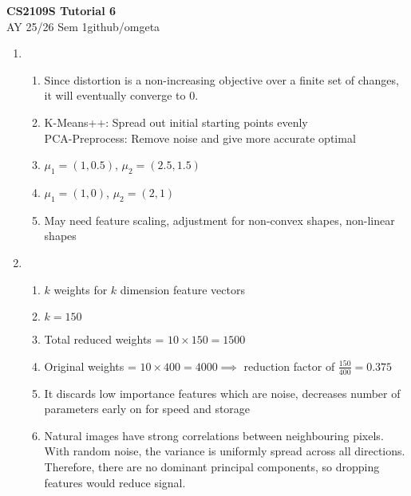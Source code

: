 \documentclass[12pt, a4paper]{article}
\newcommand{\mytitle}{CS2109S Tutorial 6}
\newcommand{\myauthor}{github/omgeta}
\newcommand{\mydate}{AY 25/26 Sem 1}
\begin{document}
\raggedright
\footnotesize
\begin{center}
{\normalsize{\textbf{\mytitle}}} \\
{\footnotesize{\mydate\hspace{2pt}\textemdash\hspace{2pt}\myauthor}}
\end{center}
\begin{enumerate}[\Alph*.]
  \item 
    \begin{enumerate}[\arabic*.]
      \item Since distortion is a non-increasing objective over a finite set of changes, it will eventually converge to 0. 

      \item K-Means++: Spread out initial starting points evenly\\
        PCA-Preprocess: Remove noise and give more accurate optimal

      \item $\mu_1 = (1, 0.5)$, $\mu_2 = (2.5, 1.5)$

      \item $\mu_1 = (1, 0)$, $\mu_2 = (2, 1)$

      \item May need feature scaling, adjustment for non-convex shapes, non-linear shapes
    \end{enumerate}

  \item 
    \begin{enumerate}[\arabic*.]
      \item $k$ weights for $k$ dimension feature vectors

      \item $k = 150$

      \item Total reduced weights = $10 \times 150 = 1500$ 

      \item Original weights = $10 \times 400 = 4000 \implies$ reduction factor of $\frac{150}{400} = 0.375$  

      \item It discards low importance features which are noise, decreases number of parameters early on for speed and storage

      \item Natural images have strong correlations between neighbouring pixels. With random noise, the variance is uniformly spread across all directions. Therefore, there are no dominant principal components, so dropping features would reduce signal. 
    \end{enumerate}
\end{enumerate}
\end{document}
